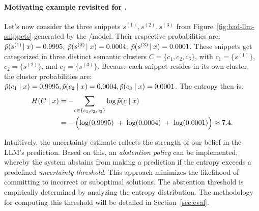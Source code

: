 \paragraph{Motivating example revisited for \textnormal{\salesforce}.} Let's now consider the three snippets $s^{(1)}, s^{(2)}, s^{(3)}$ from Figure~\ref{fig:bad-llm-snippets} generated by the \salesforce/\codegenmonoC model. 
Their respective probabilities are:
$\tilde{p}(s^{(1)}\!\mid x) = \SI{0.9995}{},\;
 \tilde{p}(s^{(2)}\!\mid x) = \SI{0.0004}{},\;
 \tilde{p}(s^{(3)}\!\mid x) = \SI{0.0001}{}$.
These snippets get categorized in three distinct semantic clusters
$C = \{ c_1, c_2, c_3 \}$, with $c_1 = \{ s^{(1)} \}$,
$c_2 = \{ s^{(2)} \}$, and $c_3 = \{ s^{(3)} \}.$
 Because each snippet resides in its own cluster, the cluster probabilities are:
   $\tilde{p}(c_1 \mid x) = \SI{0.9995}{}, \tilde{p}(c_2 \mid x) = \SI{0.0004}{}, \tilde{p}(c_3 \mid x) = \SI{0.0001}{}$.
%
The entropy then is:
\[
\begin{aligned}
   H(C \mid x)
   &=
   -\!\sum_{c \in \{c_1,c_2,c_3\}}
   \log \tilde{p}(c \mid x)
   \\
   &=
   -\,\Bigl(
      \log(\SI{0.9995}{})\;+\;\log(\SI{0.0004}{})\;+\;\log(\SI{0.0001}{}) 
   \Bigr) \approx \SI{7.4}{}.
\end{aligned}
\]


Intuitively, the uncertainty estimate reflects the strength of our belief in the LLM's prediction. 
Based on this, an \textit{abstention policy} can be implemented, whereby the system abstains from making a prediction if the entropy exceeds a predefined \emph{uncertainty threshold}. 
This approach minimizes the likelihood of committing to incorrect or suboptimal solutions. The abstention threshold is empirically determined by analyzing the entropy distribution. 
The methodology for computing this threshold will be detailed in Section~\ref{sec:eval}.

